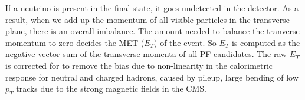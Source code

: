 If a neutrino is present in the final state, it goes undetected in the detector. As a result, when we add up the momentum of all visible particles in the transverse plane, there is an overall imbalance. The amount needed to balance the tranverse momentum to zero decides the MET ($E_{T}$) of the event. So $E_{T}$ is computed as the negative vector sum of the transverse momenta of all PF candidates. The raw $E_{T}$ is corrected for to remove the bias due to non-linearity in the calorimetric response for neutral and charged hadrons, caused by pileup, large bending of low $p_{T}$ tracks due to the strong magnetic fields in the CMS. 











   











